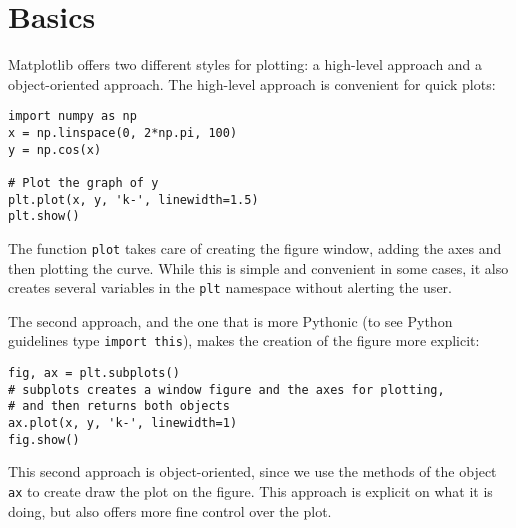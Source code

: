 \documentclass[12pt, a4paper]{article}
\begin{document}
\section{Basics}
\label{sec:org6dd3bcc}
Matplotlib offers two different styles for plotting: a high-level approach and a object-oriented approach.
The high-level approach is convenient for quick plots:
\lstset{language=jupyter-python,label= ,caption= ,captionpos=b,numbers=none}
\begin{lstlisting}
import numpy as np
x = np.linspace(0, 2*np.pi, 100)
y = np.cos(x)

# Plot the graph of y
plt.plot(x, y, 'k-', linewidth=1.5)
plt.show()
\end{lstlisting}
The function \texttt{plot} takes care of creating the figure window, adding the axes and then plotting the curve.
While this is simple and convenient in some cases, it also creates several variables in the \texttt{plt} namespace without alerting the user.

The second approach, and the one that is more Pythonic (to see Python guidelines type \texttt{import this}), makes the creation of the figure more explicit:
\lstset{language=jupyter-python,label= ,caption= ,captionpos=b,numbers=none}
\begin{lstlisting}
fig, ax = plt.subplots()
# subplots creates a window figure and the axes for plotting,
# and then returns both objects
ax.plot(x, y, 'k-', linewidth=1)
fig.show()
\end{lstlisting}
This second approach is object-oriented, since we use the methods of the object \texttt{ax} to create draw the plot on the figure.
This approach is explicit on what it is doing, but also offers more fine control over the plot.
\end{document}
